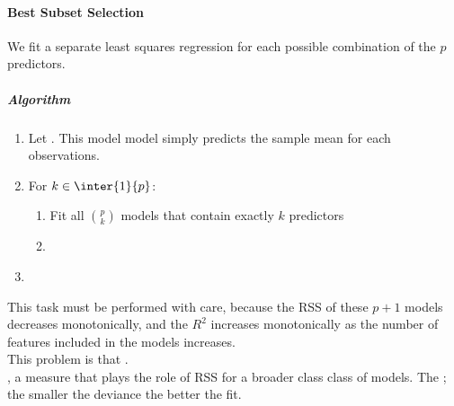 \paragraph{Best Subset Selection}
We fit a separate least squares regression for each possible 
combination of the $p$ predictors.
\subparagraph{Algorithm}
\begin{enumerate}
	\item Let . This model model simply 
		predicts the sample mean for each observations.
	\item For $k\in\inter{1}{p}$:
		\begin{enumerate}[label=\alph*]
			\item Fit all $\binom{p}{k}$ models that 
				contain exactly $k$ predictors
			\item {}\\ 
		\end{enumerate}
	\item {} 
\end{enumerate}
This task must be performed with care, because the RSS of these $p+1$
models decreases monotonically, and the $R^{2}$ increases monotonically
as the number of features included in the models increases.\\

This problem is that .\\

, a measure that plays
the role of RSS for a broader class class of models. The ; the smaller the 
deviance the better the fit.

